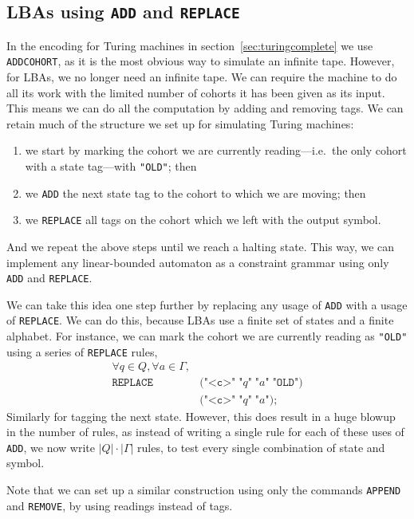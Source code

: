\documentclass[11pt]{article}
\def\t#1{\texttt{#1}}
\begin{document}
\subsection{LBAs using \t{ADD} and \t{REPLACE}}
In the encoding for Turing machines in section~\ref{sec:turingcomplete} we use
\t{ADDCOHORT}, as it is the most obvious way to simulate an infinite tape.
However, for LBAs, we no longer need an infinite tape. We can require the
machine to do all its work with the limited number of cohorts it has been given
as its input. This means we can do all the computation by adding and removing
tags. We can retain much of the structure we set up for simulating Turing
machines:
\begin{enumerate}
\item%
  we start by marking the cohort we are currently reading---i.e.\ the only
  cohort with a state tag---with \t{"OLD"}; then 
\item%
  we \t{ADD} the next state tag to the cohort to which we are moving; then
\item%
  we \t{REPLACE} all tags on the cohort which we left with the output symbol.
\end{enumerate}
And we repeat the above steps until we reach a halting state. This way, we can
implement any linear-bounded automaton as a constraint grammar using only
\t{ADD} and \t{REPLACE}.

We can take this idea one step further by replacing any usage of \t{ADD} with a
usage of \t{REPLACE}. We can do this, because LBAs use a finite set of states
and a finite alphabet. For instance, we can mark the cohort we are currently
reading as \t{"OLD"} using a series of \t{REPLACE} rules,
\[
  \begin{aligned}
    \forall q \in Q, \forall a \in \Gamma,\\
    \t{REPLACE} \; &\t{(}\t{"<c>"} \; \t{"$q$"} \; \t{"$a$"} \; \t{"OLD"}\t{)}\\
                \; &\t{(}\t{"<c>"} \; \t{"$q$"} \; \t{"$a$"}\t{)}\t{;}
  \end{aligned}
\]
Similarly for tagging the next state.
However, this does result in a huge blowup in the number of rules, as instead of
writing a single rule for each of these uses of \t{ADD}, we now write $|Q| \cdot
|\Gamma|$ rules, to test every single combination of state and symbol.

Note that we can set up a similar construction using only the commands
\t{APPEND} and \t{REMOVE}, by using readings instead of tags.
\end{document}
